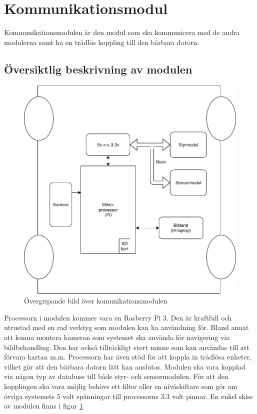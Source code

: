 \documentclass[systemskiss/skiss.tex]{subfiles}
\begin{document}
\section{Kommunikationsmodul}
Kommunikationsmodulen är den modul som ska kommunicera med de andra modulerna samt ha en trådlös koppling till den bärbara datorn. 
\subsection{Översiktlig beskrivning av modulen}
\begin{figure}[h]
    \centering
    \includegraphics[width=0.6\linewidth]{systemskiss/figures/kommodul.pdf}
    \caption{Övergripande bild över komunikationsmodulen}
    \label{fig:komskiss}
\end{figure}
\noindent
Processorn i modulen kommer vara en Rasberry Pi 3. Den är kraftfull och
utrustad med en rad verktyg som modulen kan ha användning för. Bland annat att
kunna montera kameran som systemet ska använda för navigering via
bildbehandling. Den har också tillräckligt stort minne som kan användas till
att förvara kartan m.m. Processorn har även stöd för att koppla in trådlösa
enheter, vilket gör att den bärbara datorn lätt kan anslutas. Modulen ska vara
kopplad via någon typ av databuss till både styr- och sensormodulen. För att
den kopplingen  ska vara möjlig behövs ett filter eller en nivåskiftare 
som gör om övriga systemets 5 volt spänningar till processorns 3.3 volt pinnar. 
En enkel skiss av modulen finns i figur \ref{fig:komskiss}.
\end{document}

